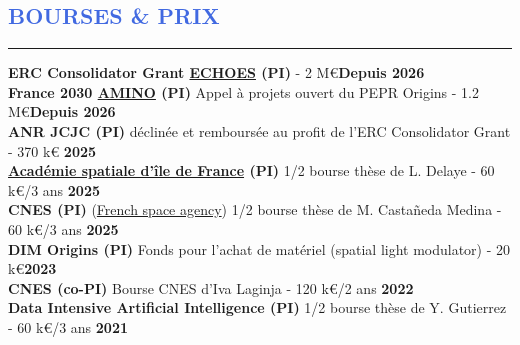 \documentclass[11pt, a4paper, french]{article}
\begin{document}
\vspace{-0.43cm}
\textcolor{RoyalBlue}{\section{\large BOURSES \& PRIX}
\vspace{-0.2cm}\hrule}

\vspace{0.4cm}
\textbf{ERC Consolidator Grant \href{https://lira.obspm.fr/erc-echoes}{ECHOES} (PI)} - 2 M\euro \hfill \textbf{Depuis 2026}\\ 

\vspace{-0.2cm}
\textbf{France 2030 \href{https://pepr-origins.fr/projet/advanced-multi-spectral-imaging-using-novel-wavefront-sensors-with-optical-photon-counting-detectors-amino/}{AMINO} (PI)} Appel à projets ouvert du PEPR Origins - 1.2 M\euro \hfill \textbf{Depuis 2026}\\ 

\vspace{-0.2cm}
\textbf{ANR JCJC (PI)} déclinée et remboursée au profit de l'ERC Consolidator Grant - 370 k\euro{} \hfill \textbf{2025}\\ 

\vspace{-0.25cm}
\textbf{\href{https://academiespatiale.fr/index.php/a-propos/porteurs-projet/}{Académie spatiale d'île de France} (PI)} 1/2 bourse thèse de L. Delaye - 60 k\euro/3 ans \hfill \textbf{2025}\\ 

\vspace{-0.25cm}
\textbf{CNES (PI)}  (\href{https://cnes.fr/en/phd-postdoc-grants}{French space agency}) 1/2 bourse thèse de M. Castañeda Medina - 60 k\euro/3 ans \hfill \textbf{2025}\\ 

\vspace{-0.2cm}
\textbf{DIM Origins (PI)} Fonds pour l'achat de matériel (spatial light modulator) - 20 k\euro \hfill \textbf{2023}\\ 

\vspace{-0.2cm}
\textbf{CNES (co-PI)} Bourse CNES d'Iva Laginja - 120 k\euro/2 ans \hfill \textbf{2022}\\ 

\vspace{-0.2cm}
\textbf{Data Intensive Artificial Intelligence (PI)} 1/2 bourse thèse de Y. Gutierrez - 60 k\euro/3 ans \hfill \textbf{2021}\\ 
\end{document}
